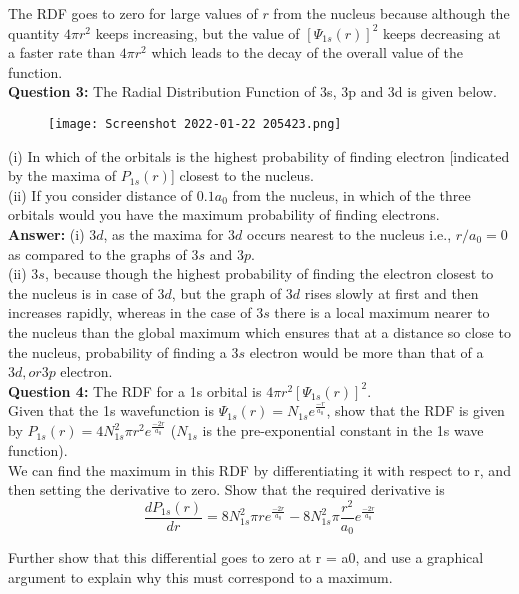 \documentclass[11pt]{article}
\begin{document}
The RDF goes to zero for large values of $r$ from the nucleus because although the quantity $4\pi r^{2}$ keeps increasing, but the value of $[\Psi_{1s}(r)]^{2}$ keeps decreasing at a faster rate than $4\pi r^{2}$ which leads to the decay of the overall value of the function.\\

\textbf{Question 3: }The Radial Distribution Function of 3s, 3p and 3d is given below.\\[16pt]
	\begin{figure}[H]
	\centering
	\texttt{[image: Screenshot 2022-01-22 205423.png]}
	\end{figure}
(i) In which of the orbitals is the highest probability of finding electron [indicated by the maxima of $P_{1s}(r)$] closest to the nucleus.\\
(ii) If you consider distance of $0.1a_{0}$ from the nucleus, in which of the three orbitals would you have the maximum probability of finding electrons.\\[16pt]

\textbf{Answer: } (i) $3d$, as the maxima for $3d$ occurs nearest to the nucleus i.e., $r/a_{0}=0$ as compared to the graphs of $3s$ and $3p$.\\
(ii) $3s$, because though the highest probability of finding the electron closest to the nucleus is in case of $3d$, but the graph of $3d$ rises slowly at first and then increases rapidly, whereas in the case of $3s$ there is a local maximum nearer to the nucleus than the global maximum which ensures that at a distance so close to the nucleus, probability of finding a $3s$ electron would be more than that of a $3d, or 3p$ electron.\\

\textbf{Question 4: }The RDF for a 1s orbital is $4\pi r^{2}[\Psi_{1s}(r)]^{2}$.\\
Given that the 1s wavefunction is $\Psi_{1s}(r)=N_{1s} e^{\frac{-r}{a_{0}}}$, show that the RDF is given by $P_{1s}(r)=4N_{1s}^{2}\pi r^{2} e^{\frac{-2r}{a_{0}}}$ ($N_{1s}$ is the pre-exponential constant in the 1s wave function).\\

We can find the maximum in this RDF by differentiating it with respect to r, and then setting
the derivative to zero. Show that the required derivative is
$$\frac{dP_{1s}(r)}{dr}=8N_{1s}^{2}\pi r e^{\frac{-2r}{a_{0}}}-8N_{1s}^{2}\pi \frac{r^{2}}{a_{0}} e^{\frac{-2r}{a_{0}}}$$

Further show that this differential goes to zero at r = a0, and use a graphical argument to
explain why this must correspond to a maximum.\\
\end{document}
